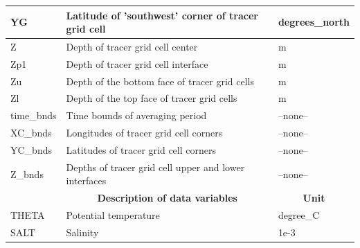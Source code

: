 \begin{longtable}{|m{}|m{}|m{}|}
YG &Latitude of 'southwest' corner of tracer grid cell &degrees\_north  \\ \hline
Z &Depth of tracer grid cell center &m  \\ \hline
Zp1 &Depth of tracer grid cell interface &m  \\ \hline
Zu &Depth of the bottom face of tracer grid cells &m  \\ \hline
Zl &Depth of the top face of tracer grid cells &m  \\ \hline
time\_bnds &Time bounds of averaging period &--none--  \\ \hline
XC\_bnds &Longitudes of tracer grid cell corners &--none--  \\ \hline
YC\_bnds &Latitudes of tracer grid cell corners &--none--  \\ \hline
Z\_bnds &Depths of tracer grid cell upper and lower interfaces &--none--  \\ \hline
\rowcolor{lightgray} \multicolumn{1}{|c|}{\textbf{Variables}} & \multicolumn{1}{|c|}{\textbf{Description of data variables}} &  \multicolumn{1}{|c|}{\textbf{Unit}}\\ \hline
THETA &Potential temperature  &degree\_C  \\ \hline
SALT &Salinity &1e-3  \\ \hline
\end{longtable}

\newp
\pagebreak

